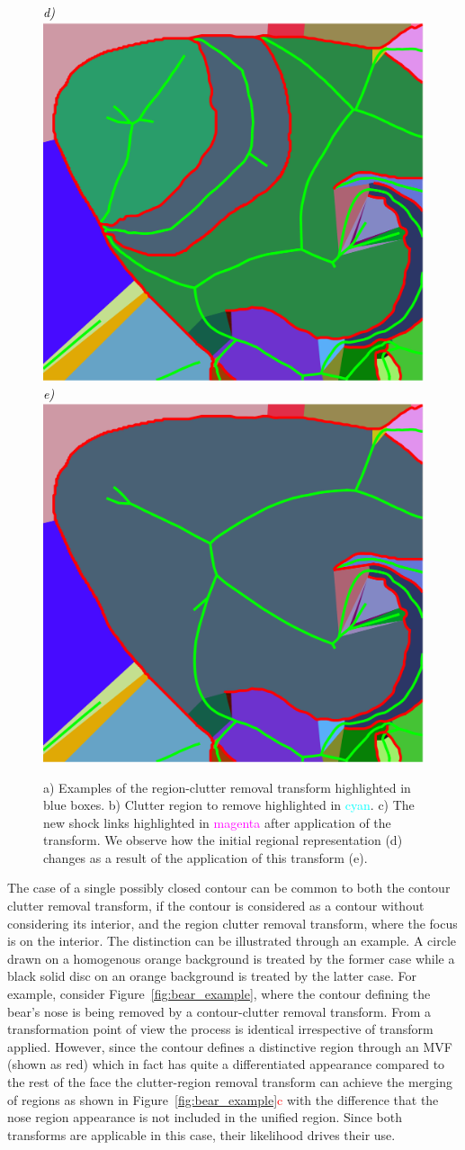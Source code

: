 \begin{figure}[!ht]
{\footnotesize\textit{\textcolor{black}{d)}}}\includegraphics[width=0.17\linewidth]{figs/clownfish_post_before_frags.pdf}
{\footnotesize\textit{\textcolor{black}{e)}}}\includegraphics[width=0.17\linewidth]{figs/clownfish_post_after_frags.pdf}
  
  \caption{a) Examples of the region-clutter removal transform highlighted in blue boxes. b) Clutter region to remove highlighted in \textcolor{cyan}{cyan}. c) The new shock links highlighted in \textcolor{magenta}{magenta} after application of the transform. We observe how the initial regional representation (d) changes as a result of the application of this transform (e).}
\label{fig:real_region_remove}
\end{figure}






The case of a single possibly closed contour can be common to both the contour clutter removal transform, if the contour is considered as a contour without considering its interior, and the region clutter removal transform, where the focus is on the interior. The distinction can be illustrated through an example. A circle drawn on a homogenous orange background is treated by the former case while a black solid disc on an orange background is treated by the latter case. For example, consider Figure~\ref{fig:bear_example}, where the contour defining the bear’s nose is being removed by a contour-clutter removal transform. From a transformation point of view the process is identical irrespective of transform applied. However, since the contour defines a distinctive region through an MVF (shown as red) which in fact has quite a differentiated appearance compared to the rest of the face the clutter-region removal transform can achieve the merging of regions as shown in Figure~\ref{fig:bear_example}\textcolor{red}{c} with the difference that the nose region appearance is not included in the unified region. Since both transforms are applicable in this case, their likelihood drives their use.


